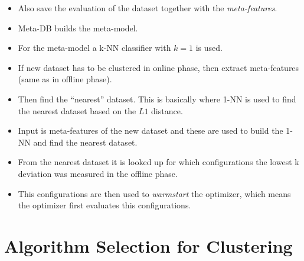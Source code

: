 \begin{itemize}
    \item Also save the evaluation of the dataset together with the \textit{meta-features}.
    \item Meta-DB builds the meta-model.
    \item For the meta-model a k-NN classifier with $k=1$ is used.
    \item If new dataset has to be clustered in online phase, then extract meta-features (same as in offline phase). 
    \item Then find the ``nearest'' dataset.
    This is basically where 1-NN is used to find the nearest dataset based on the $L1$ distance.
    \item Input is meta-features of the new dataset and these are used to build the 1-NN and find the nearest dataset.
    \item From the nearest dataset it is looked up for which configurations the lowest k deviation was measured in the offline phase.
    \item This configurations are then used to \textit{warmstart} the optimizer, which means the optimizer first evaluates this configurations.
    
    
    
    
\end{itemize}
 
 
\section{Algorithm Selection for Clustering}

